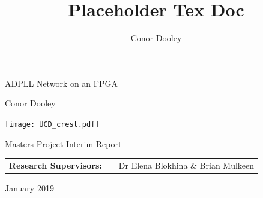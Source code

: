 \documentclass[11pt,english,british]{report}
\begin{document}
\title{Placeholder Tex Doc}
\author{Conor Dooley}
\begin{titlepage}
	
	
	
	\begin{spacing}{3}
		
		\noindent \begin{center}
			
			{\huge{}ADPLL Network on an FPGA}
			\par\end{center}{\huge \par}
	\end{spacing}
	
	\bigskip{}
	
	\begin{center}
		{\Large{}Conor Dooley}
	\end{center}
	
	\vspace{1.25cm}
	
	\begin{center}
		\texttt{[image: UCD\_crest.pdf]}\vspace{0.25cm}
	\end{center}
	
	
	\bigskip{}
	
	\begin{center}
		{\huge{}Masters Project Interim Report }
	\end{center}
	
	\vspace{1.cm}
	
	
	{\Large{}\bigskip{}
		\bigskip{}
	}{\Large \par}
	
	\noindent \begin{center}
		\begin{tabular}{lll}
			\textbf{\large{}Research Supervisors:} & \qquad{}\qquad{} & {\large{}Dr Elena Blokhina \& Brian Mulkeen}\\
		\end{tabular}
		
		\par\end{center}
	
	\vspace{1cm}
	\noindent \begin{center}
		{\large{}January  2019}
		\par\end{center}{\large \par}
	
\end{titlepage}
\doublespacing
\end{document}
